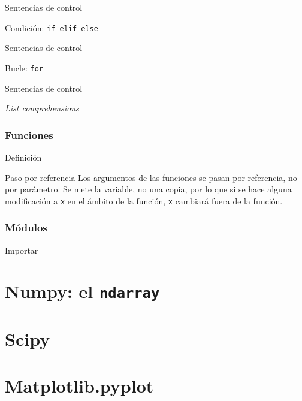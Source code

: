 \documentclass{beamer}
\begin{document}

\begin{frame}{Sentencias de control}
	\begin{block}{Condición: \texttt{if-elif-else}}
		
	\end{block}
\end{frame}

\begin{frame}{Sentencias de control}
	\begin{block}{Bucle: \texttt{for}}
		
	\end{block}
\end{frame}

\begin{frame}{Sentencias de control}
	\begin{block}{\textsl{List comprehensions}}
		
	\end{block}
\end{frame}

\begin{frame}\frametitle{Funciones}
	\begin{block}{Definición}
		
	\end{block}
	\begin{alertblock}{Paso por referencia}
		Los argumentos de las funciones se pasan por referencia, no por parámetro. Se mete la variable, no una copia, por lo que si se hace alguna modificación a \texttt{x} en el ámbito de la función, \texttt{x} cambiará fuera de la función.
	\end{alertblock}
\end{frame}

\begin{frame}\frametitle{Módulos}
	\begin{block}{Importar}
		
	\end{block}
\end{frame}

\section{Numpy: el \texttt{ndarray}}

\section{Scipy}

\section{Matplotlib.pyplot}
\end{document}
